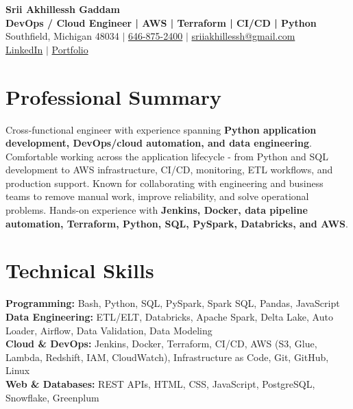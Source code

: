 \documentclass[letterpaper,10pt]{article}
\begin{document}
\fontsize{9.35pt}{10.45pt}\selectfont

\begin{center}
    {\LARGE \textbf{Srii Akhillessh Gaddam}} \\[-1pt]
    \textbf{DevOps / Cloud Engineer | AWS | Terraform | CI/CD | Python} \\[2pt]
    Southfield, Michigan 48034 $|$
    \href{tel:6468752400}{646-875-2400} $|$
    \href{mailto:sriiakhillessh@gmail.com}{sriiakhillessh@gmail.com} \\[1pt]
    \href{https://www.linkedin.com/in/srii-akhiilessh-gaddam-b48668191/}{LinkedIn} $|$
    \href{https://sriiakhillesshg.github.io/portfolio/}{Portfolio}
\end{center}
\vspace{-8pt}

\section{Professional Summary}
\small{Cross-functional engineer with experience spanning \textbf{Python application development, DevOps/cloud automation, and data engineering}. Comfortable working across the application lifecycle - from Python and SQL development to AWS infrastructure, CI/CD, monitoring, ETL workflows, and production support. Known for collaborating with engineering and business teams to remove manual work, improve reliability, and solve operational problems. Hands-on experience with \textbf{Jenkins, Docker, data pipeline automation, Terraform, Python, SQL, PySpark, Databricks, and AWS}.}

\section{Technical Skills}
\small{
\textbf{Programming:} Bash, Python, SQL, PySpark, Spark SQL, Pandas, JavaScript \\
\textbf{Data Engineering:} ETL/ELT, Databricks, Apache Spark, Delta Lake, Auto Loader, Airflow, Data Validation, Data Modeling \\
\textbf{Cloud \& DevOps:} Jenkins, Docker, Terraform, CI/CD, AWS (S3, Glue, Lambda, Redshift, IAM, CloudWatch), Infrastructure as Code, Git, GitHub, Linux \\
\textbf{Web \& Databases:} REST APIs, HTML, CSS, JavaScript, PostgreSQL, Snowflake, Greenplum
}
\end{document}
